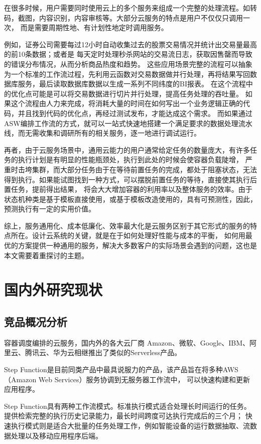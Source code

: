 在很多时候，用户需要同时使用云上的多个服务来组成一个完整的处理流程。如转码，截图，内容识别，内容审核等。大部分云服务的特点是用户不仅仅只调用一次，
而是需要周期性地、有计划性地定时调用服务。

例如，证券公司需要每过12小时自动收集过去的股票交易情况并统计出交易量最高的前10条数据；或者是
每天定时处理秒杀网站的交易流日志，获取因售罄而导致的错误分布情况，从而分析商品热度和趋势。
这些应用场景完整的流程可以抽象为一个标准的工作流过程，先利用云函数对交易数据做并行处理，再将结果写回数据库服务，最后读取数据库数据以生成一系列不同纬度的BI报表。
在这个流程中的优化点可能是可以将交易数据进行切片并行处理，提高任务处理的吞吐量。
如果这个流程由人力来完成，将消耗大量的时间在如何写出一个业务逻辑正确的代码，并且找到代码的优化点，再经过测试发布，才能达成这个需求。
而如果通过ASW编排工作流的方式，就可以一站式快速地搭建一个满足要求的数据处理流水线，而无需收集和调研所有的相关服务，逐一地进行调试运行。

再者，由于云服务场景中，通用云能力的用户通常给定任务的数量庞大，有许多任务的执行计划是有明显的性能瓶颈处，执行到此处的时候会使容器负载陡增，
严重时击垮集群，而大部分任务由于在等待前置任务的完成，都处于阻塞状态，无法得到执行。如果能试图找到一种方式，可以摆脱前置任务的等待，直接使其执行后置任务，提前得出结果，
将会大大增加容器的利用率以及整体服务的效率。由于状态机种类是基于模板直接使用，或基于模板改造使用的，具有可预测性，因此，预测执行有一定的实用价值。

综上，服务通用化、成本低廉化、效率最大化是云服务区别于其它形式的服务的特点所在。设计云系统的关键，就是在于如何处理好性能与成本的平衡，
如何用最优的方案提供一种通用的服务，解决大多数客户的实际场景会遇到的问题\cite{lu2021microservice}，这也是本文需要着重探讨的主题。


\section{国内外研究现状}

\subsection{竞品概况分析}
容器调度编排的云服务，国内外的各大云厂商 Amazon、微软、Google、IBM、阿里云、腾讯云、华为云相继推出了类似的Serverless产品。

Step Function是目前同类产品中最具说服力的产品，该产品旨在将多种AWS（Amazon Web Services）服务协调到无服务器工作流中，
可以快速构建和更新应用程序\cite{jywfbpxt}。


Step Function具有两种工作流模式。标准执行模式适合处理长时间运行的任务。提供检索完整的执行历史记录能力，最长时间跨度可达执行完成后的三个月；
快速执行模式则是适合大批量的任务处理工作，例如智能设备的运行数据抽取、流数据处理以及移动应用程序后端。

